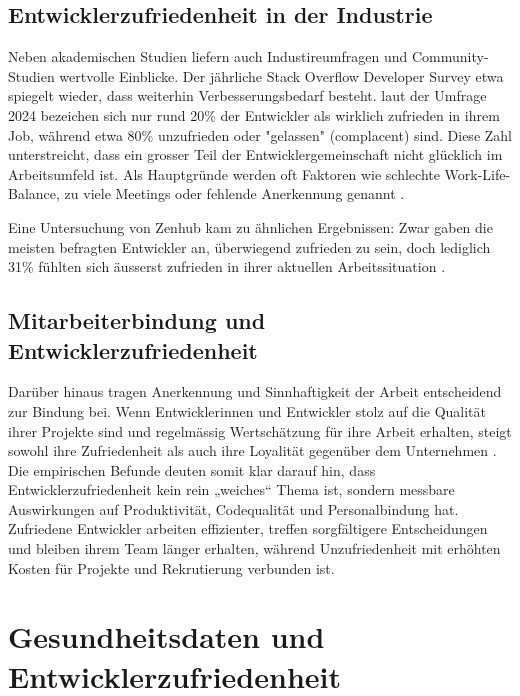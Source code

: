 \documentclass[12pt,a4paper]{report}
\begin{document}
\subsection{Entwicklerzufriedenheit in der Industrie}

Neben akademischen Studien liefern auch Industireumfragen und Community-Studien wertvolle Einblicke. Der jährliche Stack Overflow
Developer Survey etwa spiegelt wieder, dass weiterhin Verbesserungsbedarf besteht. laut der Umfrage 2024 bezeichen sich nur rund 
20\% der Entwickler als wirklich zufrieden in ihrem Job, während etwa 80\% unzufrieden oder "gelassen" (complacent) sind. Diese Zahl
unterstreicht, dass ein grosser Teil der Entwicklergemeinschaft nicht glücklich im Arbeitsumfeld ist. Als Hauptgründe werden oft
Faktoren wie schlechte Work-Life-Balance, zu viele Meetings oder fehlende Anerkennung genannt \cite{stackoverflow_survey_2025}. 

Eine Untersuchung von Zenhub kam zu ähnlichen Ergebnissen: Zwar gaben die meisten befragten Entwickler an, überwiegend zufrieden
zu sein, doch lediglich 31\% fühlten sich äusserst zufrieden in ihrer aktuellen Arbeitssituation \cite{zenhub_2022_nodate}. 

\subsection{Mitarbeiterbindung und Entwicklerzufriedenheit}

Darüber hinaus tragen Anerkennung und Sinnhaftigkeit der Arbeit entscheidend zur Bindung bei. Wenn Entwicklerinnen und Entwickler
stolz auf die Qualität ihrer Projekte sind und regelmässig Wertschätzung für ihre Arbeit erhalten, steigt sowohl ihre Zufriedenheit
als auch ihre Loyalität gegenüber dem Unternehmen \cite{sadowski_happiness_2019,graziotin_what_2018}. Die empirischen Befunde deuten
somit klar darauf hin, dass Entwicklerzufriedenheit kein rein „weiches“ Thema ist, sondern messbare Auswirkungen auf Produktivität,
Codequalität und Personalbindung hat. Zufriedene Entwickler arbeiten effizienter, treffen sorgfältigere Entscheidungen und bleiben
ihrem Team länger erhalten, während Unzufriedenheit mit erhöhten Kosten für Projekte und Rekrutierung verbunden ist.

\section{Gesundheitsdaten und Entwicklerzufriedenheit}\label{stateoftheart-gesundheit}
\end{document}
